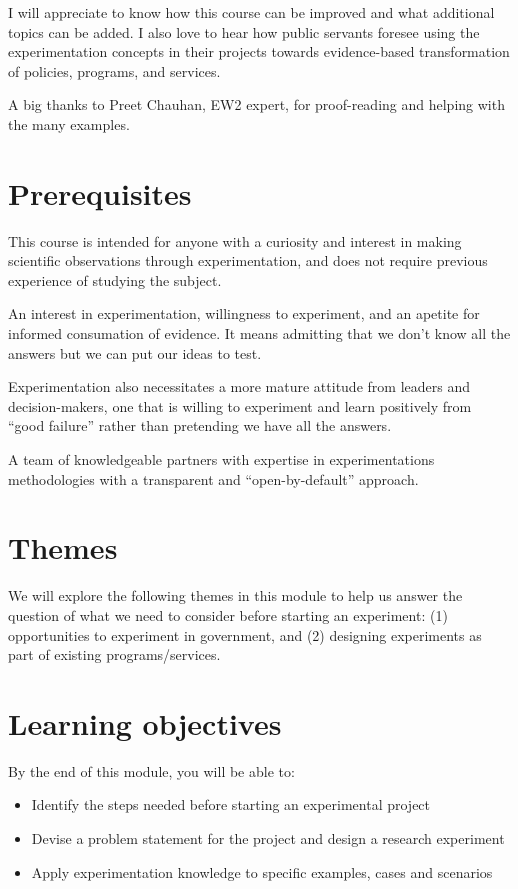 \documentclass[]{book}
\providecommand{\tightlist}{%
  \setlength{\itemsep}{0pt}\setlength{\parskip}{0pt}}
\begin{document}
I will appreciate to know how this course can be improved and what additional topics can be added. I also love to hear how public servants foresee using the experimentation concepts in their projects towards evidence-based transformation of policies, programs, and services.

A big thanks to Preet Chauhan, EW2 expert, for proof-reading and helping with the many examples.

\hypertarget{prerequisites}{%
\section{Prerequisites}\label{prerequisites}}

This course is intended for anyone with a curiosity and interest in making scientific observations through experimentation, and does not require previous experience of studying the subject.

An interest in experimentation, willingness to experiment, and an apetite for informed consumation of evidence. It means admitting that we don't know all the answers but we can put our ideas to test.

Experimentation also necessitates a more mature attitude from leaders and decision-makers, one that is willing to experiment and learn positively from ``good failure'' rather than pretending we have all the answers.

A team of knowledgeable partners with expertise in experimentations methodologies with a transparent and ``open-by-default'' approach.

\hypertarget{themes}{%
\section{Themes}\label{themes}}

We will explore the following themes in this module to help us answer the question of what we need to consider before starting an experiment: (1) opportunities to experiment in government, and (2) designing experiments as part of existing programs/services.

\hypertarget{learning-objectives}{%
\section{Learning objectives}\label{learning-objectives}}

By the end of this module, you will be able to:

\begin{itemize}
\tightlist
\item
  Identify the steps needed before starting an experimental project
\item
  Devise a problem statement for the project and design a research experiment
\item
  Apply experimentation knowledge to specific examples, cases and scenarios
\end{itemize}
\end{document}
